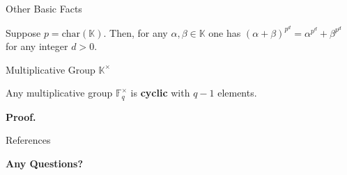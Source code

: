 \documentclass{zkdl-presentation-template}
\begin{document}
    \begin{frame}{Other Basic Facts}
        \begin{lemma}
            Suppose $p=\text{char}(\mathbb{K})$. Then, for any $\alpha,\beta \in
            \mathbb{K}$ one has $(\alpha+\beta)^{p^d} = \alpha^{p^d} +
            \beta^{p^d}$ for any integer $d>0$.
        \end{lemma}
    \end{frame}

    \begin{frame}{Multiplicative Group $\mathbb{K}^{\times}$}
        \begin{theorem}
            Any multiplicative group $\mathbb{F}_q^{\times}$ is \textbf{cyclic}
            with $q-1$ elements.
        \end{theorem}

        \textbf{Proof.}
    \end{frame}

    \begin{frame}[allowframebreaks]{References}
        \printbibliography
    \end{frame}

    \begin{frame}[plain]
        \centering
        \LARGE
        \textbf{Any Questions?} \\
        
        \vspace{0.2cm} \Huge {} \large \\
        
        \vspace{1cm}
    \end{frame}
\end{document}
